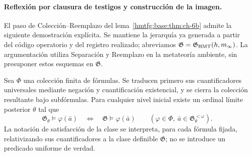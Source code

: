 \paragraph{Reflexión por clausura de testigos y construcción de la imagen.}
El paso de Colección--Reemplazo del lema~\ref{hmtfg:base:thm:ch-6b} admite la siguiente
demostración explícita. Se mantiene la jerarquía ya generada a partir del
código operatorio y del registro realizado; abreviamos
\(\mathfrak G=\mathfrak G_{\rm HMT}(h,m_\infty)\).
La argumentación utiliza Separación y Reemplazo en la metateoría ambiente,
sin presuponer estos esquemas en \(\mathfrak G\).

Sea \(\Phi\) una colección finita de fórmulas. Se traducen primero sus
cuantificadores universales mediante negación y cuantificación existencial,
y se cierra la colección resultante bajo subfórmulas. Para cualquier nivel
inicial existe un ordinal límite posterior \(\theta\) tal que
\[
 \mathfrak G_\theta\models\varphi(\bar a)
 \quad\Longleftrightarrow\quad
 \mathfrak G\models\varphi(\bar a)
 \qquad
 (\varphi\in\Phi,\ \bar a\in\mathfrak G_\theta^{<\omega}).
\]
La notación de satisfacción de la clase se interpreta, para cada fórmula
fijada, relativizando sus cuantificadores a la clase definible
\(\mathfrak G\); no se introduce un predicado uniforme de verdad.

